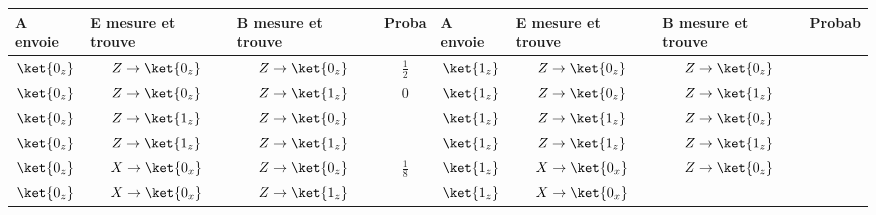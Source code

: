 \begin{table}[ptbh]
\centering
{\footnotesize {
\begin{tabular}
[c]{|l|p{2cm}|p{2.1cm}|l|l|p{2cm}|p{2.1cm}|l|}\hline
\rowcolor[gray]{0.8}\textbf{A envoie} & \textbf{E mesure et trouve} &
\textbf{B mesure et trouve} & \textbf{Proba} &
\textbf{A envoie} & \textbf{E mesure et trouve} &
\textbf{B mesure et trouve} & \textbf{Probab}\\\hline
\multicolumn{1}{|c|}{$\ket{0_{z}}$} &
\multicolumn{1}{|c|}{$Z\rightarrow\ket{0_{z}}$} &
\multicolumn{1}{|c|}{$Z\rightarrow\ket{0_{z}}$} &
\multicolumn{1}{|c|}{$\frac{1}{2}$} & \multicolumn{1}{|c|}{$\ket{1_{z}}$} &
\multicolumn{1}{|c|}{$Z\rightarrow\ket{0_{z}}$} &
\multicolumn{1}{|c|}{$Z\rightarrow\ket{0_{z}}$} & \multicolumn{1}{|c|}{}\\\hline
\multicolumn{1}{|c|}{$\ket{0_{z}}$} &
\multicolumn{1}{|c|}{$Z\rightarrow\ket{0_{z}}$} &
\multicolumn{1}{|c|}{$Z\rightarrow\ket{1_{z}}$} &
\multicolumn{1}{|c|}{$0$} & \multicolumn{1}{|c|}{$\ket{1_{z}}$} &
\multicolumn{1}{|c|}{$Z\rightarrow\ket{0_{z}}$} &
\multicolumn{1}{|c|}{$Z\rightarrow\ket{1_{z}}$} &
\multicolumn{1}{|c|}{}\\\hline
\multicolumn{1}{|c|}{$\ket{0_{z}}$} &
\multicolumn{1}{|c|}{$Z\rightarrow\ket{1_{z}}$} &
\multicolumn{1}{|c|}{$Z\rightarrow\ket{0_{z}}$} &
\multicolumn{1}{|c|}{} & \multicolumn{1}{|c|}{$\ket{1_{z}}
$} & \multicolumn{1}{|c|}{$Z\rightarrow\ket{1_{z}}$} &
\multicolumn{1}{|c|}{$Z\rightarrow\ket{0_{z}}$} &
\multicolumn{1}{|c|}{}\\\hline
\multicolumn{1}{|c|}{$\ket{0_{z}}$} &
\multicolumn{1}{|c|}{$Z\rightarrow\ket{1_{z}}$} &
\multicolumn{1}{|c|}{$Z\rightarrow\ket{1_{z}}$} &
\multicolumn{1}{|c|}{} & \multicolumn{1}{|c|}{$\ket{1_{z}}
$} & \multicolumn{1}{|c|}{$Z\rightarrow\ket{1_{z}}$} &
\multicolumn{1}{|c|}{$Z\rightarrow\ket{1_{z}}$} &
\multicolumn{1}{|c|}{}\\\hline
\multicolumn{1}{|c|}{$\ket{0_{z}}$} &
\multicolumn{1}{|c|}{$X\rightarrow\ket{0_{x}}$} &
\multicolumn{1}{|c|}{$Z\rightarrow\ket{0_{z}}$} &
\multicolumn{1}{|c|}{$\frac{1}{8}$} & \multicolumn{1}{|c|}{$\ket{1_{z}}$} &
\multicolumn{1}{|c|}{$X\rightarrow\ket{0_{x}}$} &
\multicolumn{1}{|c|}{$Z\rightarrow\ket{0_{z}}$} & \multicolumn{1}{|c|}{}\\\hline
\multicolumn{1}{|c|}{$\ket{0_{z}}$} &
\multicolumn{1}{|c|}{$X\rightarrow\ket{0_{x}}$} &
\multicolumn{1}{|c|}{$Z\rightarrow\ket{1_{z}}$} &
\multicolumn{1}{|c|}{} & \multicolumn{1}{|c|}{$\ket{1_{z}}
$} & \multicolumn{1}{|c|}{$X\rightarrow\ket{0_{x}}$} &

\end{tabular}}}
\end{table}
